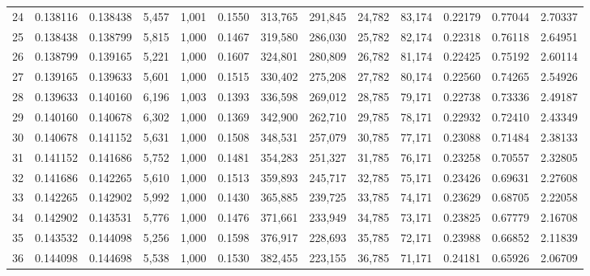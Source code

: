 \begin{tabular}{rrrrrrrrrrrrr}
24  &  0.138116 &  0.138438 &   5,457 &  1,001 &                                     0.1550 &  313,765 &  291,845 &   24,782 &   83,174 &  0.22179 &  0.77044 &  2.70337 \\
25  &  0.138438 &  0.138799 &   5,815 &  1,000 &                                     0.1467 &  319,580 &  286,030 &   25,782 &   82,174 &  0.22318 &  0.76118 &  2.64951 \\
26  &  0.138799 &  0.139165 &   5,221 &  1,000 &                                     0.1607 &  324,801 &  280,809 &   26,782 &   81,174 &  0.22425 &  0.75192 &  2.60114 \\
27  &  0.139165 &  0.139633 &   5,601 &  1,000 &                                     0.1515 &  330,402 &  275,208 &   27,782 &   80,174 &  0.22560 &  0.74265 &  2.54926 \\
28  &  0.139633 &  0.140160 &   6,196 &  1,003 &                                     0.1393 &  336,598 &  269,012 &   28,785 &   79,171 &  0.22738 &  0.73336 &  2.49187 \\
29  &  0.140160 &  0.140678 &   6,302 &  1,000 &                                     0.1369 &  342,900 &  262,710 &   29,785 &   78,171 &  0.22932 &  0.72410 &  2.43349 \\
30  &  0.140678 &  0.141152 &   5,631 &  1,000 &                                     0.1508 &  348,531 &  257,079 &   30,785 &   77,171 &  0.23088 &  0.71484 &  2.38133 \\
31  &  0.141152 &  0.141686 &   5,752 &  1,000 &                                     0.1481 &  354,283 &  251,327 &   31,785 &   76,171 &  0.23258 &  0.70557 &  2.32805 \\
32  &  0.141686 &  0.142265 &   5,610 &  1,000 &                                     0.1513 &  359,893 &  245,717 &   32,785 &   75,171 &  0.23426 &  0.69631 &  2.27608 \\
33  &  0.142265 &  0.142902 &   5,992 &  1,000 &                                     0.1430 &  365,885 &  239,725 &   33,785 &   74,171 &  0.23629 &  0.68705 &  2.22058 \\
34  &  0.142902 &  0.143531 &   5,776 &  1,000 &                                     0.1476 &  371,661 &  233,949 &   34,785 &   73,171 &  0.23825 &  0.67779 &  2.16708 \\
35  &  0.143532 &  0.144098 &   5,256 &  1,000 &                                     0.1598 &  376,917 &  228,693 &   35,785 &   72,171 &  0.23988 &  0.66852 &  2.11839 \\
36  &  0.144098 &  0.144698 &   5,538 &  1,000 &                                     0.1530 &  382,455 &  223,155 &   36,785 &   71,171 &  0.24181 &  0.65926 &  2.06709 \\

\end{tabular}
